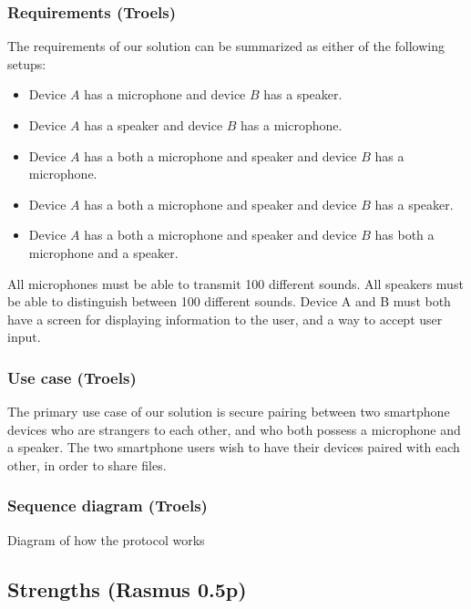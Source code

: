 \documentclass[12pt]{article}
\begin{document}
\subsubsection{Requirements (Troels)}
\label{subs:Requirements}

The requirements of our solution can be summarized as either of the following setups:

\begin{itemize}
    \item Device $A$ has a microphone and device $B$ has a speaker.
    \item Device $A$ has a speaker and device $B$ has a microphone.
    \item Device $A$ has a both a microphone and speaker and device $B$ has a microphone.
    \item Device $A$ has a both a microphone and speaker and device $B$ has a speaker.
    \item Device $A$ has a both a microphone and speaker and device $B$ has both a microphone and a speaker.
\end{itemize}

All microphones must be able to transmit 100 different sounds.
All speakers must be able to distinguish between 100 different sounds.
Device A and B must both have a screen for displaying information to the user, and a way to accept user input.

\subsubsection{Use case (Troels)}
\label{subs:Use case}

The primary use case of our solution is secure pairing between two smartphone devices who are strangers to each other, and who both possess a microphone and a speaker.
The two smartphone users wish to have their devices paired with each other, in order to share files.

\subsubsection{Sequence diagram (Troels)}
\label{subs:Sequence diagram}

Diagram of how the protocol works

\newpage

\subsection{Strengths (Rasmus 0.5p)}
\label{sub:Strengths}
\end{document}
